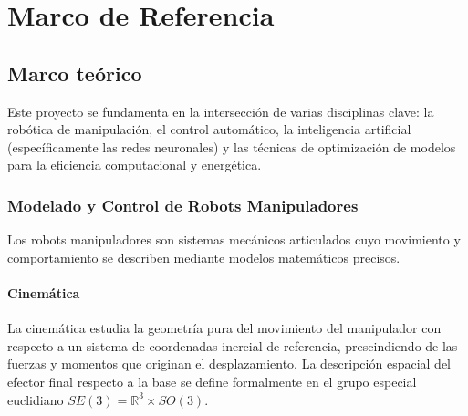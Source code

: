 \documentclass[12pt]{article}
\begin{document}
\section{Marco de Referencia}

\subsection{Marco teórico}
Este proyecto se fundamenta en la intersección de varias disciplinas clave: la robótica de manipulación, el control automático, la inteligencia artificial (específicamente las redes neuronales) y las técnicas de optimización de modelos para la eficiencia computacional y energética.

\subsubsection{Modelado y Control de Robots Manipuladores}
\label{ssec:modelado_control_robots}

Los robots manipuladores son sistemas mecánicos articulados cuyo movimiento y comportamiento se describen mediante modelos matemáticos precisos.

\paragraph{Cinemática}
\label{sssec:cinematica_robots}
La cinemática estudia la geometría pura del movimiento del manipulador con respecto a un sistema de coordenadas inercial de referencia, prescindiendo de las fuerzas y momentos que originan el desplazamiento. La descripción espacial del efector final respecto a la base se define formalmente en el grupo especial euclidiano $SE(3) = \mathbb{R}^3 \times SO(3)$.
\end{document}
